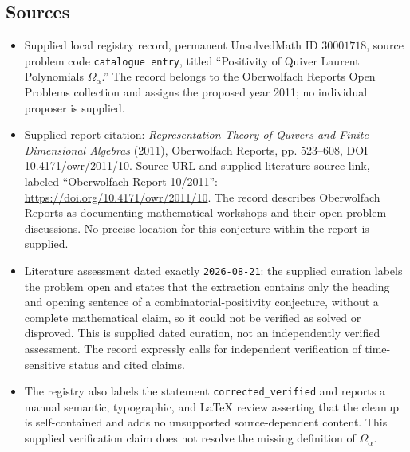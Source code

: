 \documentclass[11pt]{article}
\begin{document}
\subsection{Sources}
\begin{itemize}
\item Supplied local registry record, permanent UnsolvedMath ID \(30001718\), source problem code \texttt{catalogue entry}, titled ``Positivity of Quiver Laurent Polynomials \(\Omega_\alpha\).'' The record belongs to the Oberwolfach Reports Open Problems collection and assigns the proposed year 2011; no individual proposer is supplied.
\item Supplied report citation: \emph{Representation Theory of Quivers and Finite Dimensional Algebras} (2011), Oberwolfach Reports, pp. 523--608, DOI 10.4171/owr/2011/10. Source URL and supplied literature-source link, labeled ``Oberwolfach Report 10/2011'': \url{https://doi.org/10.4171/owr/2011/10}. The record describes Oberwolfach Reports as documenting mathematical workshops and their open-problem discussions. No precise location for this conjecture within the report is supplied.
\item Literature assessment dated exactly \texttt{2026-08-21}: the supplied curation labels the problem open and states that the extraction contains only the heading and opening sentence of a combinatorial-positivity conjecture, without a complete mathematical claim, so it could not be verified as solved or disproved. This is supplied dated curation, not an independently verified assessment. The record expressly calls for independent verification of time-sensitive status and cited claims.
\item The registry also labels the statement \texttt{corrected\_verified} and reports a manual semantic, typographic, and LaTeX review asserting that the cleanup is self-contained and adds no unsupported source-dependent content. This supplied verification claim does not resolve the missing definition of \(\Omega_\alpha\).
\end{itemize}
\end{document}
